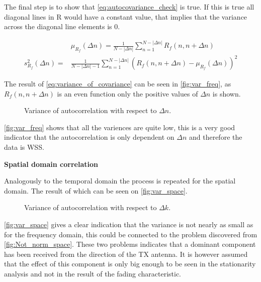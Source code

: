 The final step is to show that \autoref{eq:autocovariance_check} is true. If this is true all diagonal lines in R would have a constant value, that implies that the variance across the diagonal line elements is 0. 

\begin{align}
&\mu_{R_f}(\Delta n) = \frac{1}{N-|\Delta n|}\sum_{n = 1}^{N-|\Delta n|} R_f(n,n+\Delta n) \label{EQcor}\\
s_{R_f}^2(\Delta n) = &\frac{1}{N-|\Delta n|-1}\sum_{n = 1}^{N-|\Delta n|} \left( R_f(n,n+\Delta n) - \mu_{R_f}(\Delta n) \right)^2 \label{eq:variance_of_covariance}
\end{align}
\begin{where}
\end{where}

The result of \autoref{eq:variance_of_covariance} can be seen in \autoref{fig:var_freq}, as $R_f(n,n+\Delta n)$ is an even function only the positive values of $\Delta n$ is shown.

\begin{figure}[H]
\centering

\caption{Variance of autocorrelation with respect to $\Delta n$.}
\label{fig:var_freq}
\end{figure}

\autoref{fig:var_freq} shows that all the variences are quite low, this is a very good indicator that the autocorrelation is only dependent on $\Delta n$ and therefore the data is WSS.

\newpage
\textbf{Spatial domain correlation}

Analogously to the temporal domain the process is repeated for the spatial domain. The result of which can be seen on \autoref{fig:var_space}.

\begin{figure}[H]
\centering

\caption{Variance of autocorrelation with respect to $\Delta k$.}
\label{fig:var_space}
\end{figure}

\autoref{fig:var_space} gives a clear indication that the variance is not nearly as small as for the frequency domain, this could be connected to the problem discovered from \autoref{fig:Not_norm_space}. These two problems indicates that a dominant component has been received from the direction of the TX antenna. It is however assumed that the effect of this component is only big enough to be seen in the stationarity analysis and not in the result of the fading characteristic.
